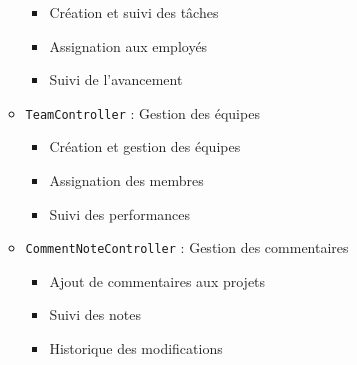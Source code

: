 \documentclass[12pt,a4paper]{article}
\begin{document}
\begin{itemize}
\begin{itemize}
        \begin{itemize}
            \item Création et suivi des tâches
            \item Assignation aux employés
            \item Suivi de l'avancement
        \end{itemize}
        \item \texttt{TeamController} : Gestion des équipes
        \begin{itemize}
            \item Création et gestion des équipes
            \item Assignation des membres
            \item Suivi des performances
        \end{itemize}
        \item \texttt{CommentNoteController} : Gestion des commentaires
        \begin{itemize}
            \item Ajout de commentaires aux projets
            \item Suivi des notes
            \item Historique des modifications
        \end{itemize}
    \end{itemize}


\end{itemize}
\end{document}
